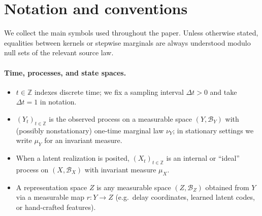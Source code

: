 \documentclass[11pt]{article}
\newcommand{\1}{\mathbf{1}}
\begin{document}
\newpage



\appendix

\section{Notation and conventions}

We collect the main symbols used throughout the paper. Unless otherwise stated, equalities between kernels or stepwise marginals are always understood modulo null sets of the relevant source law.

\paragraph{Time, processes, and state spaces.}
\begin{itemize}[leftmargin=1.7em,itemsep=2pt,topsep=2pt]
  \item $t \in \mathbb{Z}$ indexes discrete time; we fix a sampling interval $\Delta t>0$ and take $\Delta t=1$ in notation.
  \item $(Y_t)_{t\in\mathbb{Z}}$ is the observed process on a measurable space $(Y,\mathcal{B}_Y)$ with (possibly nonstationary) one-time marginal law $\nu_Y$; in stationary settings we write $\mu_Y$ for an invariant measure.
  \item When a latent realization is posited, $(X_t)_{t\in\mathbb{Z}}$ is an internal or ``ideal'' process on $(X,\mathcal{B}_X)$ with invariant measure $\mu_X$.
  \item A representation space $Z$ is any measurable space $(Z,\mathcal{B}_Z)$ obtained from $Y$ via a measurable map $r:Y\to Z$ (e.g.\ delay coordinates, learned latent codes, or hand-crafted features).
\end{itemize}
\end{document}
